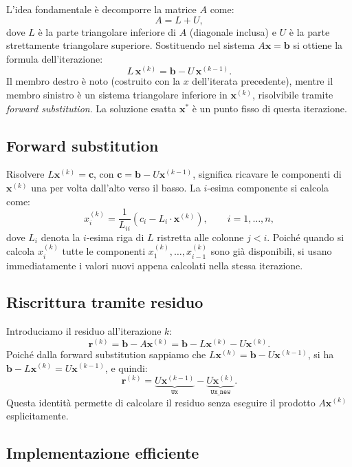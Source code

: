 \documentclass[a4paper, 12pt]{report}
\begin{document}
L'idea fondamentale è decomporre la matrice $A$ come:
\[
    A = L + U,
\]
dove $L$ è la parte triangolare inferiore di $A$ (diagonale inclusa)
e $U$ è la parte strettamente triangolare superiore. Sostituendo nel
sistema $A\mathbf{x} = \mathbf{b}$ si ottiene la formula dell'iterazione:
\[
    L\,\mathbf{x}^{(k)} = \mathbf{b} - U\,\mathbf{x}^{(k-1)}.
    \tag{Gauss-Seidel}
\]
Il membro destro è noto (costruito con la $x$ dell'iterata precedente),
mentre il membro sinistro è un sistema triangolare inferiore in
$\mathbf{x}^{(k)}$, risolvibile tramite \emph{forward substitution}.
La soluzione esatta $\mathbf{x}^*$ è un punto fisso di questa
iterazione.

\subsection*{Forward substitution}

Risolvere $L\mathbf{x}^{(k)} = \mathbf{c}$, con
$\mathbf{c} = \mathbf{b} - U\mathbf{x}^{(k-1)}$, significa ricavare
le componenti di $\mathbf{x}^{(k)}$ una per volta dall'alto verso il
basso. La $i$-esima componente si calcola come:
\[
    x_i^{(k)} = \frac{1}{L_{ii}}
    \left( c_i - L_i \cdot \mathbf{x}^{(k)} \right),
    \qquad i = 1, \ldots, n,
\]
dove $L_i$ denota la $i$-esima riga di $L$ ristretta alle colonne
$j < i$. Poiché quando si calcola $x_i^{(k)}$ tutte le componenti
$x_1^{(k)}, \ldots, x_{i-1}^{(k)}$ sono già disponibili, si usano
immediatamente i valori nuovi appena calcolati nella stessa iterazione.

\subsection*{Riscrittura tramite residuo}

Introduciamo il residuo all'iterazione $k$:
\[
    \mathbf{r}^{(k)} = \mathbf{b} - A\mathbf{x}^{(k)}
    = \mathbf{b} - L\mathbf{x}^{(k)} - U\mathbf{x}^{(k)}.
\]
Poiché dalla forward substitution sappiamo che
$L\mathbf{x}^{(k)} = \mathbf{b} - U\mathbf{x}^{(k-1)}$, si ha
$\mathbf{b} - L\mathbf{x}^{(k)} = U\mathbf{x}^{(k-1)}$, e quindi:
\[
    \mathbf{r}^{(k)}
    = \underbrace{U\mathbf{x}^{(k-1)}}_{\texttt{Ux}}
    - \underbrace{U\mathbf{x}^{(k)}}_{\texttt{Ux\_new}}.
\]
Questa identità permette di calcolare il residuo senza eseguire il
prodotto $A\mathbf{x}^{(k)}$ esplicitamente.

\subsection*{Implementazione efficiente}
\end{document}
